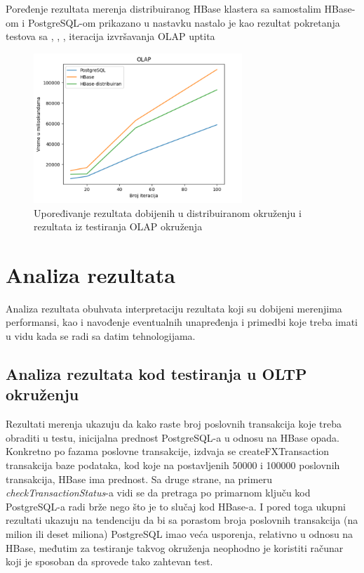 \documentclass[12pt,oneside]{memoir}
\begin{document}
Poređenje rezultata merenja distribuiranog HBase klastera sa samostalim HBase-om i PostgreSQL-om prikazano u nastavku nastalo je kao rezultat pokretanja testova sa , , ,  iteracija izvršavanja OLAP uptita

\begin{figure}[!ht]
  \centering
  \includegraphics[width=0.7\textwidth]{dist-olap.png}
  \caption{Upoređivanje rezultata dobijenih u distribuiranom okruženju i rezultata iz testiranja OLAP okruženja}
  \label{fig:grafikon}
\end{figure}



\chapter{Analiza rezultata}

Analiza rezultata obuhvata interpretaciju rezultata koji su dobijeni merenjima performansi, kao i navođenje eventualnih unapređenja i primedbi koje treba imati u vidu kada se radi sa datim tehnologijama.

\section{Analiza rezultata kod testiranja u OLTP okruženju}

Rezultati merenja ukazuju da kako raste broj poslovnih transakcija koje treba obraditi u testu, inicijalna prednost PostgreSQL-a u odnosu na HBase opada. Konkretno po fazama poslovne transakcije, izdvaja se createFXTransaction transakcija baze podataka, kod koje na postavljenih 50000 i 100000  poslovnih transakcija, HBase ima prednost. Sa druge strane, na primeru \textit{checkTransactionStatus}-a vidi se da pretraga po primarnom ključu kod PostgreSQL-a radi brže nego što je to slučaj kod HBase-a.  I pored toga ukupni rezultati ukazuju na tendenciju da bi sa porastom broja poslovnih transakcija (na milion ili deset miliona) PostgreSQL imao veća usporenja, relativno u odnosu na HBase, međutim za testiranje takvog okruženja neophodno je koristiti računar koji je sposoban da sprovede tako zahtevan test.
\end{document}
